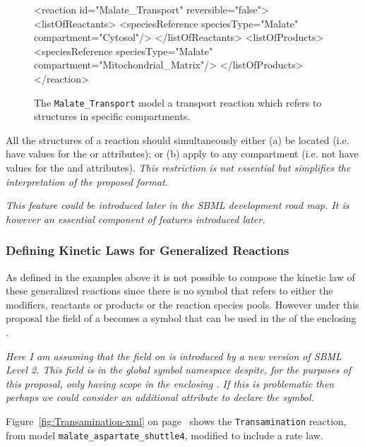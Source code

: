 \documentclass{cekarticle}
\begin{document}
\begin{figure}[h]
\begin{example}
<reaction id="Malate_Transport" reversible="false">
    <listOfReactants>
        <speciesReference speciesType="Malate" compartment="Cytosol"/>
    </listOfReactants>
    <listOfProducts>
        <speciesReference speciesType="Malate" compartment="Mitochondrial_Matrix"/>
    </listOfProducts>
</reaction>
\end{example}
\caption{The \texttt{Malate\_Transport} model a transport reaction which refers to 
structures in specific compartments.}
\label{fig:Malate_Transport-xml}
\end{figure}

All the  structures of a reaction
should simultaneously either (a) be located (i.e. have values for
the  or  attributes); or (b)
apply to any compartment (i.e. not have values for the
 and  attributes). \emph{This
restriction is not essential but simplifies the interpretation of
the proposed format}.

\emph{This feature could be introduced later in the SBML
development road map. It is however an essential component of
features introduced later.}

\subsubsection{Defining Kinetic Laws for Generalized Reactions}

As defined in the examples above it is not possible to compose the kinetic law of these generalized
reactions since there is no symbol that refers to either the modifiers, reactants or products or the
reaction species pools.  However under this proposal the  field of a
 becomes a symbol that can be used in the  of the
enclosing .

\emph{Here I am assuming that the  field on  is introduced by a
new version of SBML Level 2. This  field is in the global symbol
namespace despite, for the purposes of this proposal, only having scope in the enclosing
.  If this is problematic then perhaps we could consider an additional attribute to
declare the symbol.}

Figure~\ref{fig:Transamination-xml} on
page~\pageref{fig:Transamination-xml} shows the
\texttt{Transamination} reaction, from model
\texttt{malate\_aspartate\_shuttle4}, modified to include a rate
law.
\end{document}
